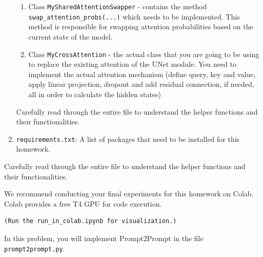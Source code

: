 \documentclass[11pt,addpoints,answers]{exam}
\begin{document}
\begin{questions}
\begin{enumerate}
\begin{enumerate}
        \item Class \lstinline{MySharedAttentionSwapper} - contains the method \lstinline{swap_attention_probs(...)} which needs to be implemented. This method is responsible for swapping attention probabilities based on the current state of the model.

        \item Class \lstinline{MyCrossAttention} - the actual class that you are going to be using to replace the existing attention of the UNet module. You need to implement the actual attention mechanism (define query, key and value, apply linear projection, dropout and add residual connection, if needed, all in order to calculate the hidden states)
    \end{enumerate}
    Carefully read through the entire file to understand the helper functions and their functionalities. 

    \item \lstinline{requirements.txt}: A list of packages that need to be installed for this homework.

\end{enumerate}

Carefully read through the entire file to understand the helper functions and their functionalities. 


We recommend conducting your final experiments for this homework on Colab. Colab provides a free T4 GPU for code execution. 
\begin{lstlisting}
(Run the run_in_colab.ipynb for visualization.)
\end{lstlisting}




In this problem, you will implement Prompt2Prompt in the file \lstinline{prompt2prompt.py}.


\end{questions}
\end{document}
